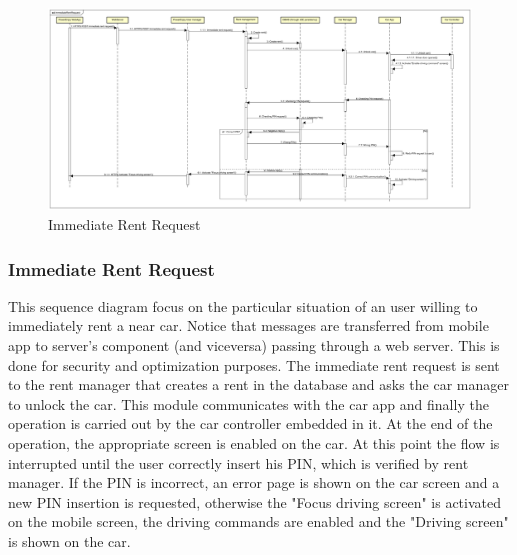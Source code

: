 \documentclass[english]{article}
\begin{document}
	\begin{landscape}
		\begin{figure}[H]
				\centering
				\includegraphics[scale=0.197]{./SequenceDiagrams/ImmediateRentRequest/ImmediateRentRequest.pdf}%
				\caption{Immediate Rent Request}
		\end{figure}
	\end{landscape}
		\subsubsection{Immediate Rent Request}
		This sequence diagram focus on the particular situation of an user willing to immediately rent a near car.
		Notice that messages are transferred from mobile app to server's component (and viceversa) passing through a web server. 		This is done for security and optimization purposes.
		The immediate rent request is sent to the rent manager that creates a rent in the database and asks the car manager to unlock the car. This module communicates with the car app and finally the operation is carried out by the car controller embedded in it. At the end of the operation, the appropriate screen is enabled on the car.
		At this point the flow is interrupted until the user correctly insert his PIN, which is verified by rent manager. If the PIN is incorrect, an error page is shown on the car screen and a new PIN insertion is requested, otherwise the "Focus driving screen" is activated on the mobile screen, the driving commands are enabled and the "Driving screen" is shown on the car. 
\end{document}
